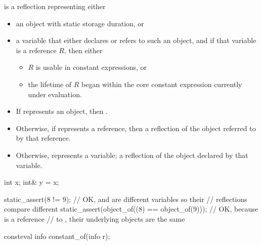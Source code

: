 \begin{itemdescr}
\pnum
\constantwhen
{} is a reflection representing either
\begin{itemize}
\item
  an object with static storage duration, or
\item
  a variable that either declares or refers to such an object,
  and if that variable is a reference $R$, then either
  \begin{itemize}
  \item
    $R$ is usable in constant expressions, or
  \item
    the lifetime of $R$ began within the core constant expression
    currently under evaluation.
  \end{itemize}
\end{itemize}

\pnum
\returns
\begin{itemize}
\item
  If  represents an object,
  then .
\item
  Otherwise, if  represents a reference,
  then a reflection of the object referred to by that reference.
\item
  Otherwise,  represents a variable;
  a reflection of the object declared by that variable.
\end{itemize}
\begin{example}
\begin{codeblock}
int x;
int& y = x;

static_assert(^^x != ^^y);                          // OK,  and  are different variables so their
                                                    // reflections compare different
static_assert(object_of((^^x) == object_of(^^y)));  // OK, because  is a reference
                                                    // to , their underlying objects are the same
\end{codeblock}
\end{example}
\end{itemdescr}

%
\begin{itemdecl}
consteval info constant_of(info r);
\end{itemdecl}

